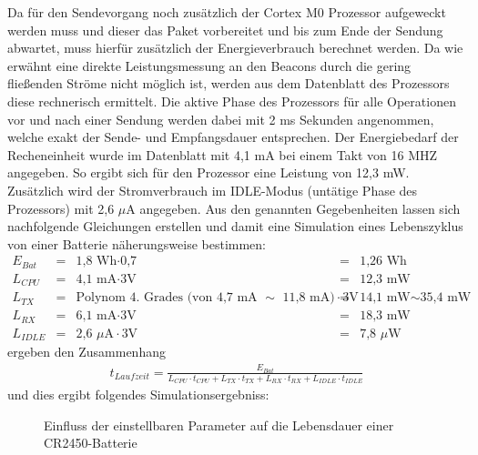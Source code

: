 Da für den Sendevorgang noch zusätzlich der Cortex M0 Prozessor aufgeweckt werden muss und dieser das Paket vorbereitet und bis zum Ende der Sendung abwartet, muss hierfür zusätzlich der Energieverbrauch berechnet werden. Da wie erwähnt eine direkte Leistungsmessung an den Beacons durch die gering fließenden Ströme nicht möglich ist, werden aus dem Datenblatt des Prozessors diese rechnerisch ermittelt. Die aktive Phase des Prozessors für alle Operationen vor und nach einer Sendung werden dabei mit 2 ms Sekunden angenommen, welche exakt der Sende- und Empfangsdauer entsprechen. Der Energiebedarf der Recheneinheit wurde im Datenblatt mit 4,1 mA bei einem Takt von 16 MHZ angegeben. So ergibt sich für den Prozessor eine Leistung von 12,3 mW. Zusätzlich wird der Stromverbrauch im IDLE-Modus (untätige Phase des Prozessors) mit 2,6 $\mu$A angegeben. Aus den genannten Gegebenheiten lassen sich nachfolgende Gleichungen erstellen und damit eine Simulation eines Lebenszyklus von einer Batterie näherungsweise bestimmen:
\begin{align*}
E_{Bat} &=& \text{1,8 Wh} \cdot \text{0,7} &=& \text{1,26 Wh}\\
L_{CPU} &=& \text{4,1 mA} \cdot \text{3V} &=& \text{12,3 mW}\\
L_{TX} &=& \text{Polynom 4. Grades (von 4,7 mA }\sim\text{ 11,8 mA)} \cdot \text{3V} &=& \text{14,1 mW} \sim \text{35,4 mW}\\
L_{RX} &=& \text{6,1 mA} \cdot \text{3V} &=& \text{18,3 mW}\\
L_{IDLE} &=& \text{2,6 } \mu\text{A} \cdot \text{3V} &=& \text{7,8 } \mu\text{W}
\end{align*}
ergeben den Zusammenhang
\begin{align*}
t_{Laufzeit} = \frac{E_{Bat}}{L_{CPU}\cdot t_{CPU} + L_{TX}\cdot t_{TX} + L_{RX}\cdot t_{RX} + L_{IDLE}\cdot t_{IDLE}} 
\end{align*}
und dies ergibt folgendes Simulationsergebniss:
\pgfplotsset{
    colormap/jet,
}
\begin{figure}[H]
\centering
{}
\caption{Einfluss der einstellbaren Parameter auf die Lebensdauer einer CR2450-Batterie}
\label{fig:iBBatLe}
\end{figure}
